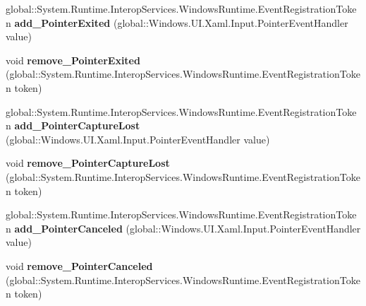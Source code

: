 \begin{DoxyCompactItemize}
\mbox{\label{interface_windows_1_1_u_i_1_1_xaml_1_1_i_u_i_element_a692d43ef89399af622b349c4c0ac5249}} 
global\+::\+System.\+Runtime.\+Interop\+Services.\+Windows\+Runtime.\+Event\+Registration\+Token {\bfseries add\+\_\+\+Pointer\+Exited} (global\+::\+Windows.\+U\+I.\+Xaml.\+Input.\+Pointer\+Event\+Handler value)
\item 
\mbox{\label{interface_windows_1_1_u_i_1_1_xaml_1_1_i_u_i_element_a934eefa2b5181fd9b0c19d7b6536d6d9}} 
void {\bfseries remove\+\_\+\+Pointer\+Exited} (global\+::\+System.\+Runtime.\+Interop\+Services.\+Windows\+Runtime.\+Event\+Registration\+Token token)
\item 
\mbox{\label{interface_windows_1_1_u_i_1_1_xaml_1_1_i_u_i_element_a4600eed2eadce86aaa8771cc8aedbb0d}} 
global\+::\+System.\+Runtime.\+Interop\+Services.\+Windows\+Runtime.\+Event\+Registration\+Token {\bfseries add\+\_\+\+Pointer\+Capture\+Lost} (global\+::\+Windows.\+U\+I.\+Xaml.\+Input.\+Pointer\+Event\+Handler value)
\item 
\mbox{\label{interface_windows_1_1_u_i_1_1_xaml_1_1_i_u_i_element_a0e8fccaf0e69daa6bc50f43458fa846a}} 
void {\bfseries remove\+\_\+\+Pointer\+Capture\+Lost} (global\+::\+System.\+Runtime.\+Interop\+Services.\+Windows\+Runtime.\+Event\+Registration\+Token token)
\item 
\mbox{\label{interface_windows_1_1_u_i_1_1_xaml_1_1_i_u_i_element_aece41d38eee31db31fcc9ce4940bc61d}} 
global\+::\+System.\+Runtime.\+Interop\+Services.\+Windows\+Runtime.\+Event\+Registration\+Token {\bfseries add\+\_\+\+Pointer\+Canceled} (global\+::\+Windows.\+U\+I.\+Xaml.\+Input.\+Pointer\+Event\+Handler value)
\item 
\mbox{\label{interface_windows_1_1_u_i_1_1_xaml_1_1_i_u_i_element_ac9b592ea4f90c7a92f1def7811d1d96f}} 
void {\bfseries remove\+\_\+\+Pointer\+Canceled} (global\+::\+System.\+Runtime.\+Interop\+Services.\+Windows\+Runtime.\+Event\+Registration\+Token token)
\item 

\end{DoxyCompactItemize}
